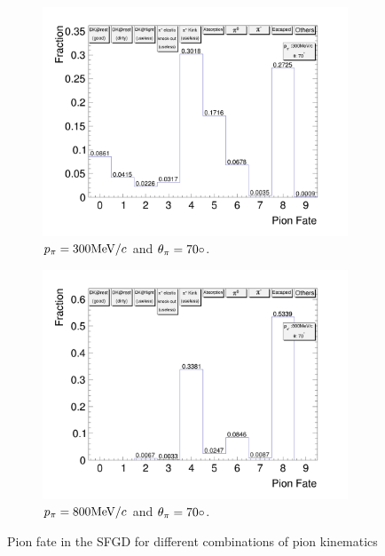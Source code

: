 \begin{figure}[t]
\begin{subfigure}{\dbfigwid\textwidth}
                    \label{subfig:pi-fate-200-70}
               \end{subfigure}
               \\
               \begin{subfigure}{\dbfigwid\textwidth}
                    \includegraphics[width=\textwidth]{figures/sel/pion_fate_300_70.png}
                    \caption{$p_{\pi}=300\textrm{MeV}/c$ and $\theta_{\pi}=70\circ$.}
                    \label{subfig:pi-fate-300-70}
               \end{subfigure}
               \begin{subfigure}{\dbfigwid\textwidth}
                    \includegraphics[width=\textwidth]{figures/sel/pion_fate_800_70.png}
                    \caption{$p_{\pi}=800\textrm{MeV}/c$ and $\theta_{\pi}=70\circ$.}
                    \label{subfig:pi-fate-800-70}
               \end{subfigure}
               \caption{Pion fate in the SFGD for different combinations of pion kinematics}
            \end{figure}

